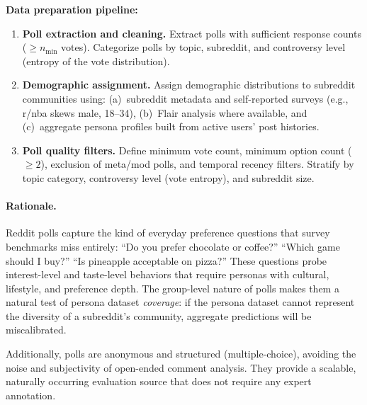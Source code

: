 \medskip\noindent\textbf{Data preparation pipeline:}
\begin{enumerate}
    \item \textbf{Poll extraction and cleaning.} Extract polls with sufficient response counts ($\geq n_{\min}$ votes). Categorize polls by topic, subreddit, and controversy level (entropy of the vote distribution).
    \item \textbf{Demographic assignment.} Assign demographic distributions to subreddit communities using: (a)~subreddit metadata and self-reported surveys (e.g., r/nba skews male, 18--34), (b)~Flair analysis where available, and (c)~aggregate persona profiles built from active users' post histories.
    \item \textbf{Poll quality filters.} Define minimum vote count, minimum option count ($\geq 2$), exclusion of meta/mod polls, and temporal recency filters. Stratify by topic category, controversy level (vote entropy), and subreddit size.
\end{enumerate}

\paragraph{Rationale.}
Reddit polls capture the kind of everyday preference questions that survey benchmarks miss entirely: ``Do you prefer chocolate or coffee?'' ``Which game should I buy?'' ``Is pineapple acceptable on pizza?''
These questions probe interest-level and taste-level behaviors that require personas with cultural, lifestyle, and preference depth.
The group-level nature of polls makes them a natural test of persona dataset \emph{coverage}: if the persona dataset cannot represent the diversity of a subreddit's community, aggregate predictions will be miscalibrated.

Additionally, polls are anonymous and structured (multiple-choice), avoiding the noise and subjectivity of open-ended comment analysis.
They provide a scalable, naturally occurring evaluation source that does not require any expert annotation.

